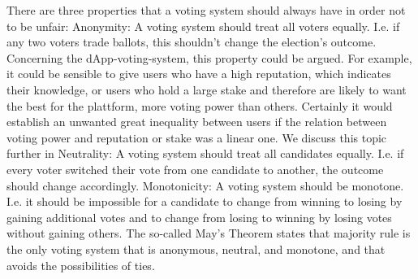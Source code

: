 
There are three properties that a voting system should always have in order not to be unfair: 
Anonymity: A voting system should treat all voters equally. I.e. if any two voters trade ballots, this shouldn't change the election's outcome. \\
Concerning the dApp-voting-system, this property could be argued. For example, it could be sensible to give users who have a high reputation, which indicates their knowledge, or users who hold a large stake and therefore are likely to want the best for the plattform, more voting power than others. Certainly it would establish an unwanted great inequality between users if the relation between voting power and reputation or stake was a linear one. We discuss this topic further in %
Neutrality: A voting system should treat all candidates equally. I.e. if every voter switched their vote from one candidate to another, the outcome should change accordingly. 
Monotonicity: A voting system should be monotone. I.e. it should be impossible for a candidate to change from winning to losing by gaining additional votes and to change from losing to winning by losing votes without gaining others. 
The so-called May's Theorem states that majority rule %
is the only voting system that is anonymous, neutral, and monotone, and that avoids the possibilities of ties. 




